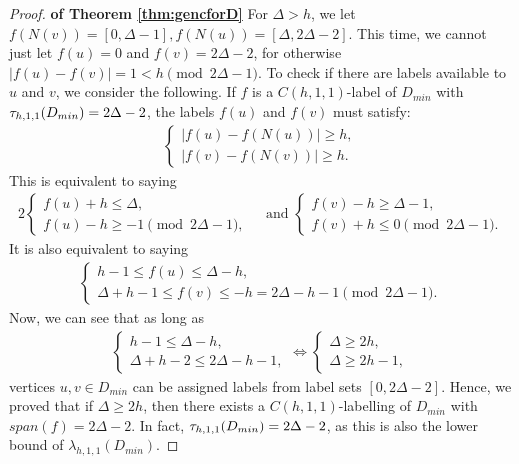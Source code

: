 \begin{proof} {\bf of Theorem \ref{thm:gencforD}}
For $\Delta > h$, we let $f(N(v)) = [0,\Delta-1], f(N(u)) = [\Delta, 2\Delta -2]$. This time, we cannot just let $f(u) = 0$ and $f(v) = 2\Delta-2$, for otherwise $|f(u) - f(v) | =1 <h \pmod{2\Delta-1}$. To check if there are labels available to $u$ and $v$, we consider the following. If $f$ is a $C(h,1,1)$-label of $D_{min}$ with $\tau_{h,1,1}(D_{min}) = 2\Delta-2$, the labels $f(u)$ and $f(v)$ must satisfy:
\begin{align}
\label{con1}
 \begin{cases}
 |f(u) - f(N(u))| \ge h, \\
 |f(v) - f(N(v))| \ge h.
 \end{cases}
\end{align} 
This is  equivalent to saying
\begin{alignat*}{2}
 \begin{cases}
 f(u) + h \le \Delta, \\
 f(u) -h \ge -1 \pmod{2\Delta-1},
 \end{cases}
& \text{  and  } 
 \begin{cases}
 f(v) - h \ge \Delta-1, \\
 f(v) + h \le 0 \pmod{2\Delta-1} .
 \end{cases}
\end{alignat*}
It is also equivalent to saying
\begin{align*}
 \begin{cases}
 h-1 \le f(u) \le \Delta -h,\\
 \Delta+h-1 \le f(v) \le -h =2\Delta-h-1 \pmod{2\Delta-1}.
 \end{cases}
\end{align*}
Now, we can see that as long as  
\begin{align*}
 \begin{cases}
 h-1 \le \Delta-h, \\
 \Delta+h-2 \le 2\Delta-h-1,
 \end{cases}
\iff
 \begin{cases}
 \Delta \ge 2h, \\
 \Delta \ge 2h-1,
 \end{cases}
\end{align*}
vertices $u,v \in D_{min}$ can be assigned labels from label sets $[0, 2\Delta-2]$. Hence, we proved that if $\Delta \ge 2h$, then there exists a $C(h,1,1)$-labelling of $D_{min}$ with $span(f) = 2\Delta-2$. In fact, $\tau_{h,1,1}(D_{min}) = 2\Delta-2$, as this is also the lower bound of $\lambda_{h,1,1}(D_{min})$. 


\end{proof}
